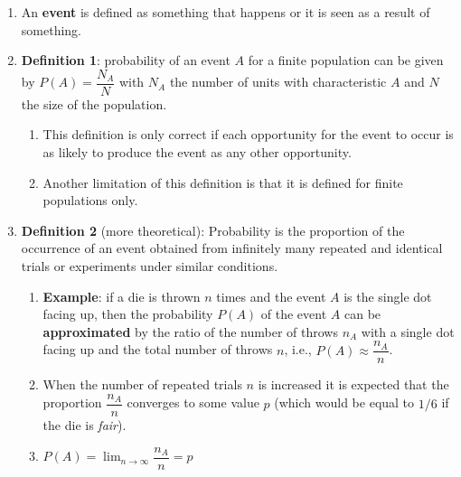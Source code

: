 \begin{enumerate}
    \item An \textbf{event} is defined as something that happens or it is seen as a result of something.
    \hfill \cite{statistics/book/Statistics-for-Data-Scientists/Maurits-Kaptein}

    \item \textbf{Definition 1}: probability of an event $A$ for a finite population can be given by $P(A) = \dfrac{N_A}{N}$ with $N_A$ the number of units with characteristic $A$ and $N$ the size of the population.
    \hfill \cite{statistics/book/Statistics-for-Data-Scientists/Maurits-Kaptein}
    \begin{enumerate}
        \item This definition is only correct if each opportunity for the event to occur is as likely to produce the event as any other opportunity.
        \hfill \cite{statistics/book/Statistics-for-Data-Scientists/Maurits-Kaptein}

        \item Another limitation of this definition is that it is defined for finite populations only.
        \hfill \cite{statistics/book/Statistics-for-Data-Scientists/Maurits-Kaptein}
    \end{enumerate}

    \item \textbf{Definition 2} (more theoretical): Probability is the proportion of the occurrence of an event obtained from infinitely many repeated and identical trials or experiments under similar conditions.
    \hfill \cite{statistics/book/Statistics-for-Data-Scientists/Maurits-Kaptein}
    \begin{enumerate}
        \item \textbf{Example}: if a die is thrown $n$ times and the event $A$ is the single dot facing up, then the probability $P (A)$ of the event $A$ can be \textbf{approximated} by the ratio of the number of throws $n_A$ with a single dot facing up and the total number of throws $n$, i.e., $P(A) \approx \dfrac{n_A}{n}$.
        \hfill \cite{statistics/book/Statistics-for-Data-Scientists/Maurits-Kaptein}

        \item When the number of repeated trials $n$ is increased it is expected that the proportion $\dfrac{n_A}{n}$ converges to some value $p$ (which would be equal to $1/6$ if the die is \textit{fair}).
        \hfill \cite{statistics/book/Statistics-for-Data-Scientists/Maurits-Kaptein}

        \item $P(A) =\displaystyle \lim_{n\to \infty} \dfrac{n_A}{n} = p$
        \hfill \cite{statistics/book/Statistics-for-Data-Scientists/Maurits-Kaptein}
    \end{enumerate}


\end{enumerate}
